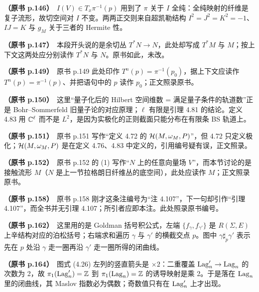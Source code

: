 \noindent \textbf{（原书 p.146）}\ $I(V)\in T_x\pi^{-1}(p)$ 用到了 $\pi$ 关于 $I$ 全纯：全纯映射的纤维是复子流形，故切空间对 $I$ 不变。两两正交则来自超凯勒结构 $I^2=J^2=K^2=-1$、$IJ=K$ 与 $g_M$ 关于三者的 Hermite 性。\par\smallskip

\noindent \textbf{（原书 p.147）}\ 本段开头说的是余切丛 $T^*N\to N$，此处却写成 $T^*M$ 与 $M$；按上下文这两处应分别读作 $T^*N$ 与 $N$。原书如此，未改。\par\smallskip

\noindent \textbf{（原书 p.149）}\ 原书 p.149 此处印作 $T^n(p)=\pi^{-1}(p_0)$，据上下文应读作 $T^n(p)=\pi^{-1}(p)$、并把语句中的 $p$ 读作 $p_0$；正文照录原书。\par\smallskip

\noindent \textbf{（原书 p.150）}\ 这里“量子化后的 Hilbert 空间维数 = 满足量子条件的轨道数”正是 Bohr–Sommerfeld 旧量子论的对应原理；$\ell$ 有限是引理 4.81 的结论。定义 4.83 用 $\mathbb{C}^\ell$ 而不是 $L^2$，是因为实极化的正则截面只能分布在有限条 BS 轨道上。\par\smallskip

\noindent \textbf{（原书 p.151）}\ 原书 p.151 写作“定义 4.72 的 $\mathcal{H}(M,\omega_M,P)$”，但 4.72 只定义极化；$\mathcal{H}(M,\omega_M,P)$ 是在定义 4.76、4.83 中定义的，引用编号疑有误，正文照录。\par\smallskip

\noindent \textbf{（原书 p.152）}\ 原书 p.152 的 (1) 写作“$N$ 上的任意向量场 $V$”，而本节讨论的是接触流形 $M$（$N$ 是上一节拉格朗日纤维丛的底空间），此处应读作 $M$；正文照录原书。\par\smallskip

\noindent \textbf{（原书 p.158）}\ 原书 p.158 刚才这条注编号为“注 4.107”，下一句却引作“引理 4.107”，而全书并无引理 4.107；所引者应即本注。此处照录原书编号。\par\smallskip

\noindent \textbf{（原书 p.162）}\ 这里用的是 Goldman 括号积公式，左端 $\{f_\gamma,f_{\gamma'}\}$ 是 $R(\Sigma,E)$ 上辛结构对应的泊松括号；右端求和遍历 $\gamma$ 与 $\gamma'$ 的横截交点 $p$。图中 $\gamma\sharp_p\gamma'$ 表示先在 $p$ 处沿 $\gamma$ 走一圈再沿 $\gamma'$ 走一圈所得的闭曲线。\par\smallskip

\noindent \textbf{（原书 p.164）}\ 图式 (4.26) 左列的竖直箭头是 $\times 2$：二重覆盖 $\operatorname{Lag}'_n\to\operatorname{Lag}_n$ 的次数为 2，故 $\pi_1(\operatorname{Lag}'_n)=\mathbb{Z}$ 到 $\pi_1(\operatorname{Lag}_n)=\mathbb{Z}$ 的诱导映射是乘 2。于是落在 $\operatorname{Lag}_n$ 里的闭曲线，其 Maslov 指数必为偶数；奇数值只有在 $\operatorname{Lag}'_n$ 上才出现。\par\smallskip


